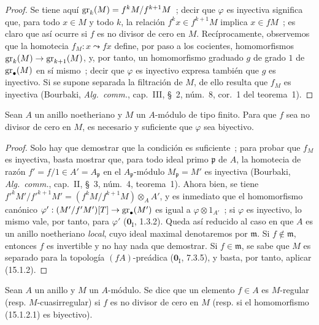 \begin{proof}
Se tiene aquí $\operatorname{gr}_k(M)=f^kM/f^{k+1}M$~; decir que $\varphi$ es inyectiva
significa que, para todo $x\in M$ y todo $k$, la relación
$f^kx\in f^{k+1}M$ implica $x\in fM$~; es claro que así ocurre si $f$ es no
divisor de cero en $M$. Recíprocamente, observemos que la homotecia
$f_M:x\leadsto fx$ define, por paso a los cocientes, homomorfismos
$\operatorname{gr}_k(M)\to\operatorname{gr}_{k+1}(M)$, y, por tanto, un homomorfismo graduado $g$ de grado
$1$ de $\operatorname{gr}_\bullet(M)$ en sí mismo~; decir que $\varphi$ es inyectivo expresa
también que $g$ es inyectivo. Si se supone separada la filtración de $M$, de
ello resulta que $f_M$ es inyectiva (Bourbaki, \emph{Alg.~comm.}, cap.~III,
\S~2, núm.~8, cor.~1 del teorema~1).
\end{proof}

\begin{corollary}[15.1.3]
\label{0.15.1.3-fr}
Sean $A$ un anillo noetheriano y $M$ un $A$-módulo de tipo finito. Para que
$f$ sea no divisor de cero en $M$, es necesario y suficiente que $\varphi$ sea
biyectivo.
\end{corollary}

\begin{proof}
Solo hay que demostrar que la condición es suficiente~; para probar que $f_M$
es inyectiva, basta mostrar que, para todo ideal primo $\mathfrak p$ de $A$,
la homotecia de razón $f'=f/1\in A'=A_{\mathfrak p}$ en el
$A_{\mathfrak p}$-módulo $M_{\mathfrak p}=M'$ es inyectiva (Bourbaki,
\emph{Alg.~comm.}, cap.~II, \S~3, núm.~4, teorema~1). Ahora bien, se tiene
$f'^kM'/f'^{k+1}M'=(f^kM/f^{k+1}M)\otimes_A A'$, y es inmediato que
el homomorfismo canónico $\varphi':(M'/f'M')[T]\to\operatorname{gr}_\bullet(M')$ es igual a
$\varphi\otimes 1_{A'}$~; si $\varphi$ es inyectivo, lo mismo vale, por tanto,
para $\varphi'$ ($\mathbf{0}_{\mathrm I}$, 1.3.2). Queda así reducido al caso en que $A$
es un anillo noetheriano \emph{local}, cuyo ideal maximal denotaremos por
$\mathfrak m$. Si $f\notin\mathfrak m$, entonces $f$ es invertible y no hay
nada que demostrar. Si $f\in\mathfrak m$, se sabe que $M$ es separado para la
topología $(fA)$-preádica ($\mathbf{0}_{\mathrm I}$, 7.3.5), y basta, por tanto,
aplicar (15.1.2).
\end{proof}

\begin{definition}[15.1.4]
\label{0.15.1.4-fr}
Sean $A$ un anillo y $M$ un $A$-módulo. Se dice que un elemento $f\in A$ es
$M$-regular (\textup{resp.} $M$-cuasirregular) si $f$ es no divisor de
cero en $M$ (\textup{resp.} si el homomorfismo (15.1.2.1) es biyectivo).
\end{definition}

